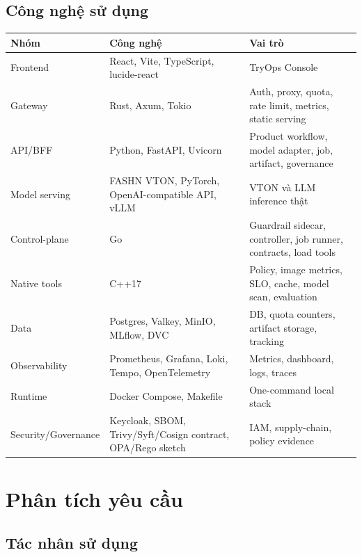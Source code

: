 \documentclass[12pt,a4paper,oneside]{report}
\begin{document}
\section{Công nghệ sử dụng}

\begin{longtable}{p{3.3cm}p{5.2cm}p{6.2cm}}
\toprule
\textbf{Nhóm} & \textbf{Công nghệ} & \textbf{Vai trò} \\
\midrule
Frontend & React, Vite, TypeScript, lucide-react & TryOps Console \\
Gateway & Rust, Axum, Tokio & Auth, proxy, quota, rate limit, metrics, static serving \\
API/BFF & Python, FastAPI, Uvicorn & Product workflow, model adapter, job, artifact, governance \\
Model serving & FASHN VTON, PyTorch, OpenAI-compatible API, vLLM & VTON và LLM inference thật \\
Control-plane & Go & Guardrail sidecar, controller, job runner, contracts, load tools \\
Native tools & C++17 & Policy, image metrics, SLO, cache, model scan, evaluation \\
Data & Postgres, Valkey, MinIO, MLflow, DVC & DB, quota counters, artifact storage, tracking \\
Observability & Prometheus, Grafana, Loki, Tempo, OpenTelemetry & Metrics, dashboard, logs, traces \\
Runtime & Docker Compose, Makefile & One-command local stack \\
Security/Governance & Keycloak, SBOM, Trivy/Syft/Cosign contract, OPA/Rego sketch & IAM, supply-chain, policy evidence \\
\bottomrule
\end{longtable}

\chapter{Phân tích yêu cầu}

\section{Tác nhân sử dụng}
\end{document}
